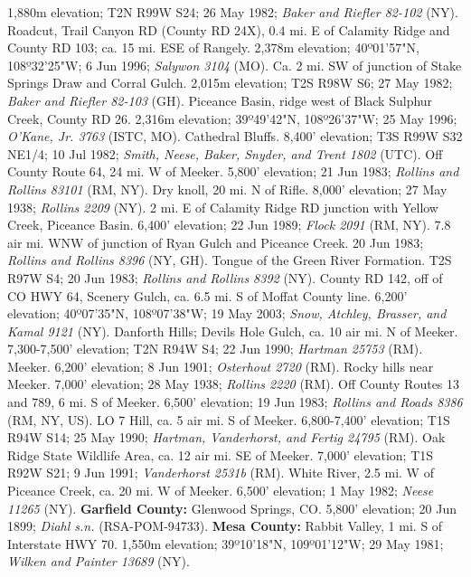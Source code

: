 1,880m elevation; T2N R99W S24; 26 May 1982;
\textit{Baker and Riefler 82-102} (NY).
Roadcut, Trail Canyon RD (County RD 24X), 0.4 mi. E of Calamity Ridge and
County RD 103; ca. 15 mi. ESE of Rangely. 2,378m elevation;
40º01'57"N, 108º32'25"W; 6 Jun 1996; \textit{Salywon 3104} (MO).
Ca. 2 mi. SW of junction of Stake Springs Draw and Corral Gulch. 2,015m
elevation; T2S R98W S6; 27 May 1982; \textit{Baker and Riefler 82-103} (GH).
Piceance Basin, ridge west of Black Sulphur Creek, County RD 26.
2,316m elevation; 39º49'42"N, 108º26'37"W; 25 May 1996;
\textit{O'Kane, Jr. 3763} (ISTC, MO).
Cathedral Bluffs. 8,400' elevation; T3S R99W S32 NE1/4; 10 Jul 1982;
\textit{Smith, Neese, Baker, Snyder, and Trent 1802} (UTC).
Off County Route 64, 24 mi. W of Meeker. 5,800' elevation; 21 Jun 1983;
\textit{Rollins and Rollins 83101} (RM, NY).
Dry knoll, 20 mi. N of Rifle. 8,000' elevation; 27 May 1938;
\textit{Rollins 2209} (NY).
2 mi. E of Calamity Ridge RD junction with Yellow Creek, Piceance Basin.
6,400' elevation; 22 Jun 1989; \textit{Flock 2091} (RM, NY).
7.8 air mi. WNW of junction of Ryan Gulch and Piceance Creek. 20 Jun 1983;
\textit{Rollins and Rollins 8396} (NY, GH).
Tongue of the Green River Formation. T2S R97W S4; 20 Jun 1983;
\textit{Rollins and Rollins 8392} (NY).
County RD 142, off of CO HWY 64, Scenery Gulch, ca. 6.5 mi. S of Moffat
County line. 6,200' elevation; 40º07'35"N, 108º07'38"W; 19 May 2003;
\textit{Snow, Atchley, Brasser, and Kamal 9121} (NY).
Danforth Hills; Devils Hole Gulch, ca. 10 air mi. N of Meeker.
7,300-7,500' elevation; T2N R94W S4; 22 Jun 1990; \textit{Hartman 25753} (RM).
Meeker. 6,200' elevation; 8 Jun 1901; \textit{Osterhout 2720} (RM).
Rocky hills near Meeker. 7,000' elevation; 28 May 1938;
\textit{Rollins 2220} (RM).
Off County Routes 13 and 789, 6 mi. S of Meeker. 6,500' elevation; 19 Jun 1983;
\textit{Rollins and Roads 8386} (RM, NY, US).
LO 7 Hill, ca. 5 air mi. S of Meeker. 6,800-7,400' elevation; T1S R94W S14;
25 May 1990; \textit{Hartman, Vanderhorst, and Fertig 24795} (RM).
Oak Ridge State Wildlife Area, ca. 12 air mi. SE of Meeker. 7,000' elevation;
T1S R92W S21; 9 Jun 1991; \textit{Vanderhorst 2531b} (RM).
White River, 2.5 mi. W of Piceance Creek, ca. 20 mi. W of Meeker.
6,500' elevation; 1 May 1982; \textit{Neese 11265} (NY).
  \textbf{Garfield County:}
Glenwood Springs, CO. 5,800' elevation; 20 Jun 1899;
\textit{Diahl s.n.} (RSA-POM-94733).
  \textbf{Mesa County:}
Rabbit Valley, 1 mi. S of Interstate HWY 70. 1,550m elevation; 39º10'18"N,
109º01'12"W; 29 May 1981; \textit{Wilken and Painter 13689} (NY).
